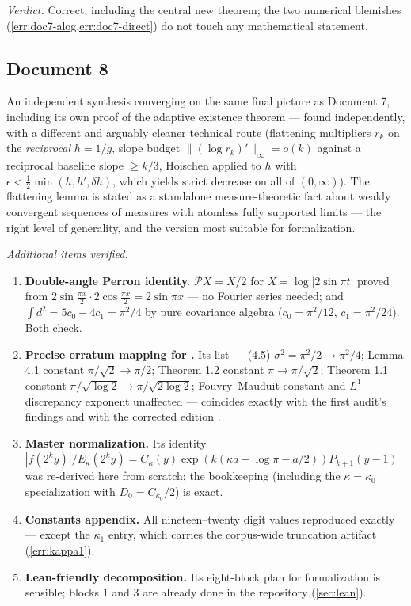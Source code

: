 \documentclass[11pt,oneside]{article}
\theoremstyle{definition}
\theoremstyle{remark}
\begin{document}
\emph{Verdict.}  Correct, including the central new theorem; the two
numerical blemishes (\cref{err:doc7-alog,err:doc7-direct}) do not touch
any mathematical statement.

\subsection{Document 8}
\label{ssec:doc8}

An independent synthesis converging on the same final picture as
Document 7, including its own proof of the adaptive existence theorem
--- found independently, with a different and arguably cleaner
technical route (flattening multipliers $r_k$ on the \emph{reciprocal}
$h=1/g$, slope budget $\|(\log r_k)'\|_\infty=o(k)$ against a
reciprocal baseline slope $\ge k/3$, Hoischen applied to $h$ with
$\epsilon<\frac12\min(h,h',\delta h)$, which yields strict decrease on
all of $(0,\infty)$).  The flattening lemma is stated as a standalone
measure-theoretic fact about weakly convergent sequences of measures
with atomless fully supported limits --- the right level of generality,
and the version most suitable for formalization.

\emph{Additional items verified.}
\begin{enumerate}
\item \textbf{Double-angle Perron identity.}  $\mathcal PX=X/2$ for
$X=\log|2\sin\pi t|$ proved from
$2\sin\frac{\pi x}2\cdot2\cos\frac{\pi x}2=2\sin\pi x$ --- no Fourier
series needed; and $\int d^2=5c_0-4c_1=\pi^2/4$ by pure covariance
algebra ($c_0=\pi^2/12$, $c_1=\pi^2/24$).  Both check.
\item \textbf{Precise erratum mapping for \cite{ahl2017}.}  Its list
--- (4.5) $\sigma^2=\pi^2/2\to\pi^2/4$; Lemma 4.1 constant
$\pi/\sqrt2\to\pi/2$; Theorem 1.2 constant $\pi\to\pi/\sqrt2$; Theorem
1.1 constant $\pi/\sqrt{\log2}\to\pi/\sqrt{2\log2}$; Fouvry--Mauduit
constant and $L^1$ discrepancy exponent unaffected --- coincides
exactly with the first audit's findings and with the corrected edition
\cite{ahl-corrected}.
\item \textbf{Master normalization.}  Its identity
$|f(2^ky)|/E_\kappa(2^ky)=C_\kappa(y)\exp(k(\kappa a-\log\pi-a/2))
P_{k+1}(y-1)$ was re-derived here from scratch; the bookkeeping
(including the $\kappa=\kappa_0$ specialization with $D_0=C_{\kappa_0}/2$)
is exact.
\item \textbf{Constants appendix.}  All nineteen--twenty digit values
reproduced exactly --- except the $\kappa_1$ entry, which carries the
corpus-wide truncation artifact (\cref{err:kappa1}).
\item \textbf{Lean-friendly decomposition.}  Its eight-block plan for
formalization is sensible; blocks 1 and 3 are already done in the
repository (\cref{sec:lean}).
\end{enumerate}
\end{document}
